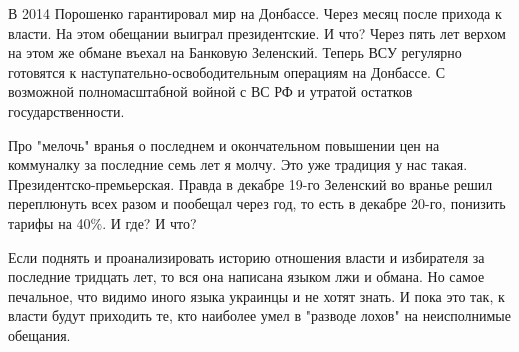 В 2014 Порошенко гарантировал мир на Донбассе. Через месяц после прихода к
власти. На этом обещании выиграл президентские. И что? Через пять лет верхом на
этом же обмане въехал на Банковую Зеленский. Теперь ВСУ регулярно готовятся к
наступательно-освободительным операциям на Донбассе. С возможной
полномасштабной  войной с ВС РФ и утратой остатков государственности.

Про "мелочь" вранья о последнем и окончательном повышении цен на коммуналку за
последние семь лет я молчу. Это уже традиция у нас такая.
Президентско-премьерская. Правда в декабре 19-го Зеленский во вранье решил
переплюнуть всех разом и пообещал через год, то есть в декабре 20-го, понизить
тарифы на 40\%. И где? И что?

Если поднять и проанализировать  историю отношения власти и избирателя за
последние тридцать лет, то вся она написана языком лжи и обмана. Но самое
печальное, что видимо иного языка украинцы и не хотят знать. И пока это так, к
власти будут приходить те, кто наиболее умел в "разводе лохов" на неисполнимые
обещания.
